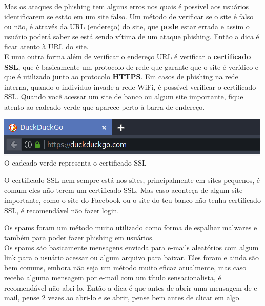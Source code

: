 \documentclass[12pt, letterpaper, Monospace:12]{report}
\begin{document}
	Mas os ataques de phishing tem alguns erros nos quais é possível aos usuários identificarem se estão em um site falso. Um método de verificar se o site é falso ou não, é através da URL (endereço) do site, que \textbf{pode} estar errada e assim o usuário poderá saber se está sendo vítima de um ataque phishing. Então a dica é ficar atento à URL do site.\\

	E uma outra forma além de verificar o endereço URL é verificar o \textbf{certificado SSL}, que é basicamente um protocolo de rede que garante que o site é verídico e que é utilizado junto ao protocolo \textbf{HTTPS}. Em casos de phishing na rede interna, quando o indivíduo invade a rede WiFi, é possível verificar o certificado SSL. Quando você acessar um site de banco ou algum site importante, fique atento ao cadeado verde que aparece perto à barra de endereço.

	\begin{center} %
		\includegraphics[scale=1]{Duck.png}\\
		\footnotesize O cadeado verde representa o certificado SSL
	\end{center}

	O certificado SSL nem sempre está nos sites, principalmente em sites pequenos, é comum eles não terem um certificado SSL. Mas caso aconteça de algum site importante, como o site do Facebook ou o site do teu banco não tenha certíficado SSL, é recomendável não fazer login.\\

\pagebreak

	Os \href{https://criptowiki.miraheze.org/wiki/Spam}{spams} foram um método muito utilizado como forma de espalhar malwares e também para poder fazer phishing em usuários.\\

	Os spams são basicamente mensagens enviada para e-mails aleatórios com algum link para o usuário acessar ou algum arquivo para baixar. Eles foram e ainda são bem comuns, embora não seja um método muito eficaz atualmente, mas caso receba alguma mensagem por e-mail com um título sensacionalista, é recomendável não abri-lo. Então a dica é que antes de abrir uma mensagem de e-mail, pense 2 vezes ao abri-lo e se abrir, pense bem antes de clicar em algo.\\
\end{document}
